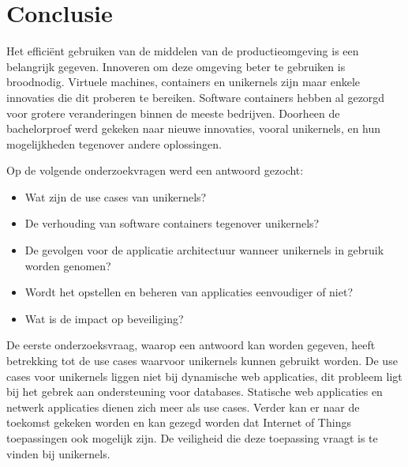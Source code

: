 \documentclass[pdftex,a4paper,12pt,twoside]{report}
\begin{document}












\chapter{Conclusie}
\label{ch:conclusie}

Het efficiënt gebruiken van de middelen van de productieomgeving is een belangrijk gegeven. Innoveren om deze omgeving beter te gebruiken is broodnodig. Virtuele machines, containers en unikernels zijn maar enkele innovaties die dit proberen te bereiken. Software containers hebben al gezorgd voor grotere veranderingen binnen de meeste bedrijven. Doorheen de bachelorproef werd gekeken naar nieuwe innovaties, vooral unikernels, en hun mogelijkheden tegenover andere oplossingen.

Op de volgende onderzoekvragen werd een antwoord gezocht:

\begin{itemize}  
\item Wat zijn de use cases van unikernels?
\item De verhouding van software containers tegenover unikernels?
\item De gevolgen voor de applicatie architectuur wanneer unikernels in gebruik worden genomen?
\item Wordt het opstellen en beheren van applicaties eenvoudiger of niet?
\item Wat is de impact op beveiliging?
\end{itemize}

De eerste onderzoeksvraag, waarop een antwoord kan worden gegeven, heeft betrekking tot de use cases waarvoor unikernels kunnen gebruikt worden. De use cases voor unikernels liggen niet bij dynamische web applicaties, dit probleem ligt bij het gebrek aan ondersteuning voor databases. Statische web applicaties en netwerk applicaties dienen zich meer als use cases. Verder kan er naar de toekomst gekeken worden en kan gezegd worden dat Internet of Things toepassingen ook mogelijk zijn. De veiligheid die deze toepassing vraagt is te vinden bij unikernels.
\end{document}
